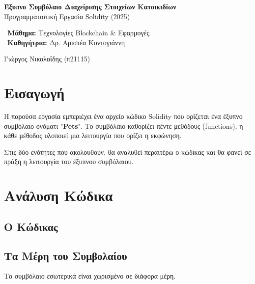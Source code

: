 \documentclass[12pt,a4paper]{article}
\begin{document}


\begin{titlepage}
    \centering
    \vspace*{2cm}
    
    {\huge\textbf{Έξυπνο Συμβόλαιο Διαχείρισης Στοιχείων Κατοικιδίων}}\\
    \vspace{2cm}
    {\large Προγραμματιστική Εργασία Solidity (2025)}
    \vspace{3cm}
    
    {\large\ \textbf{Μάθημα:} Τεχνολογίες Blockchain \& Εφαρμογές}\\
    {\large\ \textbf{Καθηγήτρια:} Δρ. Αριστέα Κοντογιάννη}\\
    \vspace{2cm}
    
    {\large Γιώργος Νικολαΐδης (π21115)}\\
\end{titlepage}

\section{Εισαγωγή}
Η παρούσα εργασία εμπεριέχει ένα αρχείο κώδικο Solidity που ορίζεται ένα έξυπνο συμβόλαιο ονόματι "\textbf{Pets}". Το συμβόλαιο καθορίζει πέντε μεθόδους (functions), η κάθε μέθοδος υλοποιεί μια λειτουργία που ορίζει η εκφώνηση. 

Στις δύο ενότητες που ακολουθούν, θα αναλυθεί περαιτέρω ο κώδικας και θα φανεί σε πράξη η λειτουργία του έξυπνου συμβόλαιου.

\newpage

\section{Ανάλυση Κώδικα}

\subsection{Ο Κώδικας}


\subsection{Τα Μέρη του Συμβολαίου}
Το συμβόλαιο εσωτερικά είναι χωρισμένο σε διάφορα μέρη.
\end{document}
